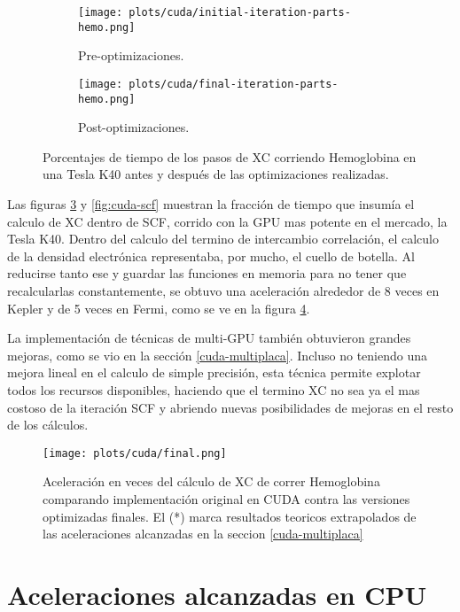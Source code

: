 \begin{figure}[htbp]
\centering
\begin{subfigure}[b]{\plotwidthtres}
   \texttt{[image: plots/cuda/initial-iteration-parts-hemo.png]}
   \caption{Pre-optimizaciones.}
   \label{fig:initial-cuda-parts}
 \end{subfigure}
 \begin{subfigure}[b]{\plotwidthtres}
   \texttt{[image: plots/cuda/final-iteration-parts-hemo.png]}
   \caption{Post-optimizaciones.}
   \label{fig:final-cuda-parts}
 \end{subfigure}
 \caption{Porcentajes de tiempo de los pasos de XC corriendo Hemoglobina en una Tesla K40 antes y despu\'es de
 las optimizaciones realizadas.}
 \label{fig:cuda-parts}
\end{figure}

Las figuras \ref{fig:cuda-parts} y \ref{fig:cuda-scf} muestran la fracci\'on de tiempo que insum\'ia el
calculo de XC dentro de SCF, corrido con la GPU mas potente en el mercado, la Tesla K40.
Dentro del calculo del termino de intercambio correlaci\'on, el calculo de la densidad electr\'onica
representaba, por mucho, el cuello de botella. Al reducirse tanto ese y guardar las funciones en
memoria para no tener que recalcularlas constantemente, se obtuvo una aceleraci\'on alrededor de 8
veces en Kepler y de 5 veces en Fermi, como se ve en la figura \ref{fig:cuda-final}.

La implementaci\'on de t\'ecnicas de multi-GPU tambi\'en obtuvieron grandes mejoras, como se vio en la
secci\'on \ref{cuda-multiplaca}. Incluso no teniendo una mejora lineal en el calculo de simple
precisi\'on, esta t\'ecnica permite explotar todos los recursos disponibles, haciendo que el termino
XC no sea ya el mas costoso de la iteraci\'on SCF y abriendo nuevas posibilidades de mejoras en el
resto de los c\'alculos.

\begin{figure}[htbp]
   \centering
   \texttt{[image: plots/cuda/final.png]}
   \caption{Aceleraci\'on en veces del c\'alculo de XC de correr Hemoglobina comparando implementaci\'on original en CUDA contra
   las versiones optimizadas finales. El (*) marca resultados teoricos extrapolados de las
 aceleraciones alcanzadas en la seccion \ref{cuda-multiplaca}}
   \label{fig:cuda-final}
\end{figure}


\section{Aceleraciones alcanzadas en CPU}

